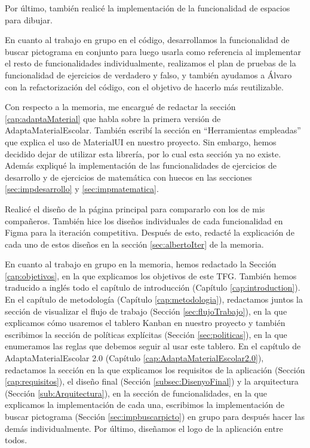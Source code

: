 Por último, también realicé la implementación de la funcionalidad de espacios para dibujar.

En cuanto al trabajo en grupo en el código, desarrollamos la funcionalidad de buscar pictograma en conjunto para luego usarla como referencia al implementar el resto de funcionalidades individualmente, realizamos el plan de pruebas de la funcionalidad de ejercicios de verdadero y falso, y también ayudamos a Álvaro con la refactorización del código, con el objetivo de hacerlo más reutilizable.

Con respecto a la memoria, me encargué de redactar la sección \ref{cap:adaptaMaterial} que habla sobre la primera versión de AdaptaMaterialEscolar. También escribí la sección en “Herramientas empleadas” que explica el uso de MaterialUI en nuestro proyecto. Sin embargo, hemos decidido dejar de utilizar esta librería, por lo cual esta sección ya no existe. Además expliqué la implementación de las funcionalidades de ejercicios de desarrollo y de ejercicios de matemática con huecos en las secciones \ref{sec:impdesarrollo} y \ref{sec:impmatematica}.

Realicé el diseño de la página principal para compararlo con los de mis compañeros. También hice los diseños individuales de cada funcionalidad en Figma para la iteración competitiva. Después de esto, redacté la explicación de cada uno de estos diseños en la sección \ref{sec:albertoIter} de la memoria.

En cuanto al trabajo en grupo en la memoria, hemos redactado la Sección \ref{cap:objetivos}, en la que explicamos los objetivos de este TFG. También hemos traducido a inglés todo el capítulo de introducción (Capítulo \ref{cap:introduction}). En el capítulo de metodología (Capítulo \ref{cap:metodologia}), redactamos juntos la sección de visualizar el flujo de trabajo (Sección \ref{sec:flujoTrabajo}), en la que explicamos cómo usaremos el tablero Kanban en nuestro proyecto y también escribimos la sección de políticas explícitas (Sección \ref{sec:politicas}), en la que enumeramos las reglas que debemos seguir al usar este tablero. En el capítulo de AdaptaMaterialEscolar 2.0 (Capítulo \ref{cap:AdaptaMaterialEscolar2.0}), redactamos la sección en la que explicamos los requisitos de la aplicación (Sección \ref{cap:requisitos}), el diseño final (Sección \ref{subsec:DisenyoFinal}) y la arquitectura (Sección \ref{sub:Arquitectura}), en la sección de funcionalidades, en la que explicamos la implementación de cada una, escribimos la implementación de buscar pictograma (Sección \ref{sec:impbuscarpicto}) en grupo para después hacer las demás individualmente. Por último, diseñamos el logo de la aplicación entre todos.



